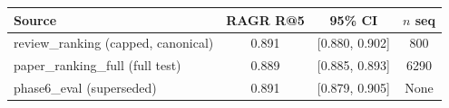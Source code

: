 \begin{tabular}{lccc}
\toprule
Source & RAGR R@5 & 95\% CI & $n$ seq \\
\midrule
review\_ranking (capped, canonical) & 0.891 & [0.880, 0.902] & 800 \\
paper\_ranking\_full (full test) & 0.889 & [0.885, 0.893] & 6290 \\
phase6\_eval (superseded) & 0.891 & [0.879, 0.905] & None \\
\bottomrule
\end{tabular}
